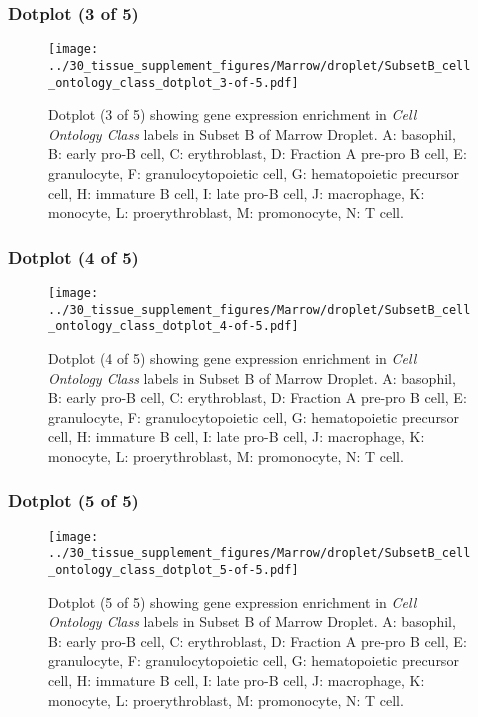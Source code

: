 \clearpage

\subsubsection{Dotplot (3 of 5)}
\begin{figure}[h]
\centering
\texttt{[image: ../30\_tissue\_supplement\_figures/Marrow/droplet/SubsetB\_cell\_ontology\_class\_dotplot\_3-of-5.pdf]}

\caption{ Dotplot (3 of 5)  showing gene expression enrichment in \emph{Cell Ontology Class} labels in Subset B of Marrow Droplet. A: basophil, B: early pro-B cell, C: erythroblast, D: Fraction A pre-pro B cell, E: granulocyte, F: granulocytopoietic cell, G: hematopoietic precursor cell, H: immature B cell, I: late pro-B cell, J: macrophage, K: monocyte, L: proerythroblast, M: promonocyte, N: T cell.}
\end{figure}


\clearpage

\subsubsection{Dotplot (4 of 5)}
\begin{figure}[h]
\centering
\texttt{[image: ../30\_tissue\_supplement\_figures/Marrow/droplet/SubsetB\_cell\_ontology\_class\_dotplot\_4-of-5.pdf]}

\caption{ Dotplot (4 of 5)  showing gene expression enrichment in \emph{Cell Ontology Class} labels in Subset B of Marrow Droplet. A: basophil, B: early pro-B cell, C: erythroblast, D: Fraction A pre-pro B cell, E: granulocyte, F: granulocytopoietic cell, G: hematopoietic precursor cell, H: immature B cell, I: late pro-B cell, J: macrophage, K: monocyte, L: proerythroblast, M: promonocyte, N: T cell.}
\end{figure}


\clearpage

\subsubsection{Dotplot (5 of 5)}
\begin{figure}[h]
\centering
\texttt{[image: ../30\_tissue\_supplement\_figures/Marrow/droplet/SubsetB\_cell\_ontology\_class\_dotplot\_5-of-5.pdf]}

\caption{ Dotplot (5 of 5)  showing gene expression enrichment in \emph{Cell Ontology Class} labels in Subset B of Marrow Droplet. A: basophil, B: early pro-B cell, C: erythroblast, D: Fraction A pre-pro B cell, E: granulocyte, F: granulocytopoietic cell, G: hematopoietic precursor cell, H: immature B cell, I: late pro-B cell, J: macrophage, K: monocyte, L: proerythroblast, M: promonocyte, N: T cell.}
\end{figure}


